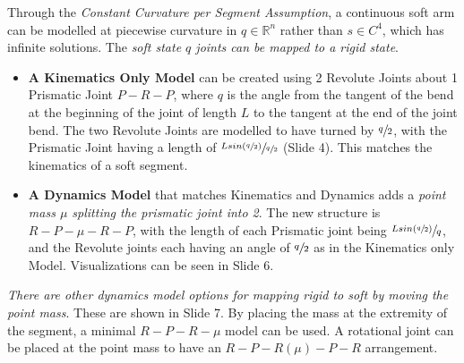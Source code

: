 \documentclass[onecolumn,a4paper]{article}
\begin{document}
Through the \emph{Constant Curvature per Segment Assumption}, a continuous soft arm can be modelled at piecewise curvature in $q \in \mathbb{R}^n$ rather than $s \in C^4$, which has infinite solutions. The \emph{soft state $q$ joints can be mapped to a rigid state}.

\begin{itemize}
    \item \textbf{A Kinematics Only Model} can be created using 2 Revolute Joints about 1 Prismatic Joint $P-R-P$, where $q$ is the angle from the tangent of the bend at the beginning of the joint of length $L$ to the tangent at the end of the joint bend. The two Revolute Joints are modelled to have turned by $\sfrac{q}{2}$, with the Prismatic Joint having a length of $\sfrac{Lsin(\sfrac{q}{2})}{\sfrac{q}{2}}$ (Slide 4). This matches the kinematics of a soft segment.
    \item \textbf{A Dynamics Model} that matches Kinematics and Dynamics adds a \emph{point mass $\mu$ splitting the prismatic joint into 2}. The new structure is $R-P-\mu-R-P$, with the length of each Prismatic joint being $\sfrac{Lsin(\sfrac{q}{2})}{q}$, and the Revolute joints each having an angle of $\sfrac{q}{2}$ as in the Kinematics only Model. Visualizations can be seen in Slide 6.
\end{itemize}

\emph{There are other dynamics model options for mapping rigid to soft by moving the point mass}. These are shown in Slide 7. By placing the mass at the extremity of the segment, a minimal $R-P-R-\mu$ model can be used. A rotational joint can be placed at the point mass to have an $R-P-R(\mu)-P-R$ arrangement.
\end{document}
